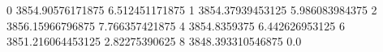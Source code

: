 0 3854.90576171875 6.512451171875
1 3854.37939453125 5.986083984375
2 3856.15966796875 7.766357421875
4 3854.8359375 6.442626953125
6 3851.216064453125 2.82275390625
8 3848.393310546875 0.0
